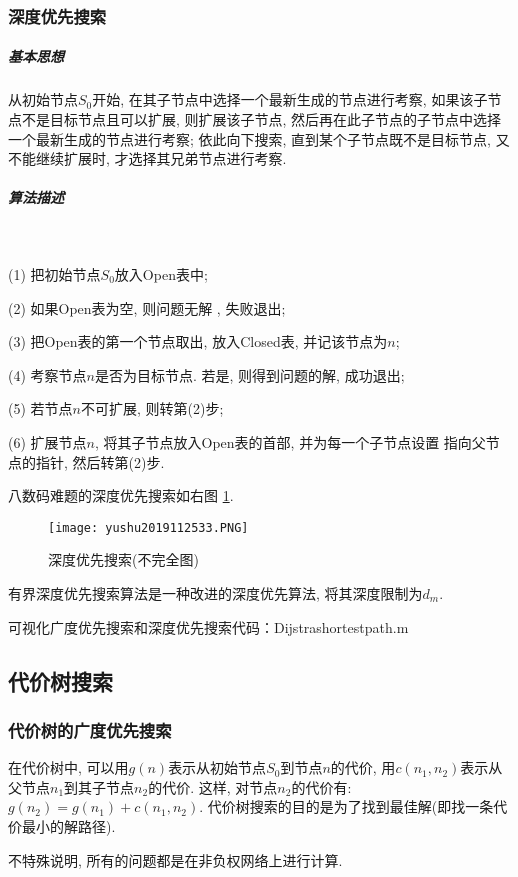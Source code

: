 \subsubsection{深度优先搜索}
\subparagraph{基本思想}
    从初始节点$S_0$开始, 在其子节点中选择一个最新生成的节点进行考察, 如果该子节点不是目标节点且可以扩展, 则扩展该子节点, 然后再在此子节点的子节点中选择一个最新生成的节点进行考察;
    依此向下搜索, 直到某个子节点既不是目标节点, 又不能继续扩展时, 才选择其兄弟节点进行考察.
\subparagraph{算法描述}~{}

\quad   (1) 把初始节点$S_0$放入Open表中;

\quad   (2) 如果Open表为空, 则问题无解 , 失败退出;

\quad   (3) 把Open表的第一个节点取出, 放入Closed表, 并记该节点为$n$;

\quad   (4) 考察节点$n$是否为目标节点. 若是, 则得到问题的解, 成功退出;

\quad   (5) 若节点$n$不可扩展, 则转第(2)步;

\quad   (6) 扩展节点$n$, 将其子节点放入Open表的首部, 并为每一个子节点设置 指向父节点的指针, 然后转第(2)步.
\begin{example}
    \quad 八数码难题的深度优先搜索如右图 \ref{AI32fig33}.
\end{example}
\begin{figure}[H]
    \centering
    \texttt{[image: yushu2019112533.PNG]}
    \caption{深度优先搜索(不完全图) }
    \label{AI32fig33}
\end{figure}
\begin{remark}
    有界深度优先搜索算法是一种改进的深度优先算法, 将其深度限制为$d_m$.
\end{remark}

可视化广度优先搜索和深度优先搜索代码：Dijstrashortestpath.m
\subsection{代价树搜索}
\subsubsection{代价树的广度优先搜索}
    在代价树中, 可以用$g(n)$表示从初始节点$S_0$到节点$n$的代价, 用$c(n_1, n_2)$表示从父节点$n_1$到其子节点$n_2$的代价.
这样, 对节点$n_2$的代价有: $g(n_2)=g(n_1)+c(n_1, n_2)$. 代价树搜索的目的是为了找到最佳解(即找一条代价最小的解路径).
\begin{remark}
  不特殊说明, 所有的问题都是在非负权网络上进行计算.
\end{remark}
